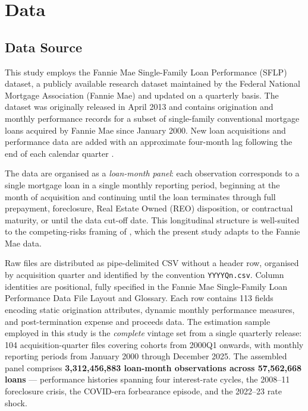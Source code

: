 
\chapter{Data}
\label{chap:data}

\section{Data Source}
\label{sec:data-source}

This study employs the Fannie Mae Single-Family Loan Performance
(SFLP) dataset, a publicly available research dataset maintained by
the Federal National Mortgage Association (Fannie Mae) and updated on
a quarterly basis.  The dataset was originally released in April 2013
and contains origination and monthly performance records for a subset
of single-family conventional mortgage loans acquired by Fannie Mae
since January 2000.  New loan acquisitions and performance data are
added with an approximate four-month lag following the end of each
calendar quarter \citep{fanniemae2024}.

The data are organised as a \emph{loan-month panel}: each observation
corresponds to a single mortgage loan in a single monthly reporting
period, beginning at the month of acquisition and continuing until the
loan terminates through full prepayment, foreclosure, Real Estate
Owned (REO) disposition, or contractual maturity, or until the data
cut-off date.  This longitudinal structure is well-suited to the
competing-risks framing of \citet{sirignano2021}, which the present
study adapts to the Fannie Mae data.

Raw files are distributed as pipe-delimited CSV without a header row,
organised by acquisition quarter and identified by the convention
\texttt{YYYYQn.csv}.  Column identities are positional, fully
specified in the Fannie Mae Single-Family Loan Performance Data File
Layout and Glossary.  Each row contains 113 fields encoding static
origination attributes, dynamic monthly performance measures, and
post-termination expense and proceeds data.  The estimation sample
employed in this study is the \emph{complete} vintage set from a
single quarterly release: 104 acquisition-quarter files covering
cohorts from 2000Q1 onwards, with monthly reporting periods from
January 2000 through December 2025.  The assembled panel comprises
\textbf{3{,}312{,}456{,}883 loan-month observations across
57{,}562{,}668 loans} --- performance histories spanning four
interest-rate cycles, the 2008--11 foreclosure crisis, the COVID-era
forbearance episode, and the 2022--23 rate shock.

